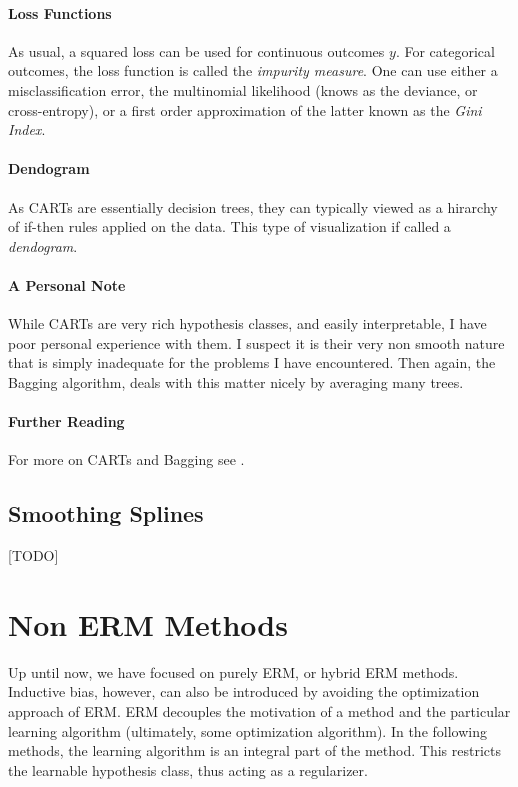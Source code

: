 \documentclass[12pt,a4paper]{article}
\theoremstyle{plain}
\theoremstyle{definition}
\begin{document}
\paragraph{Loss Functions}
As usual, a squared loss can be used for continuous outcomes $y$.
For categorical outcomes, the loss function is called the \emph{impurity measure}.
One can use either a misclassification error, the multinomial likelihood (knows as the deviance, or cross-entropy), or a first order approximation of the latter known as the \emph{Gini Index}.


\paragraph{Dendogram}
As CARTs are essentially decision trees, they can typically viewed as a hirarchy of if-then rules applied on the data.
This type of visualization if called a \emph{dendogram}.

\paragraph{A Personal Note}
While CARTs are very rich hypothesis classes, and easily interpretable, I have poor personal experience with them. 
I suspect it is their very non smooth nature that is simply inadequate for the problems I have encountered.
Then again, the Bagging algorithm, deals with this matter nicely by averaging many trees.


\paragraph{Further Reading}
For more on CARTs and Bagging see \citep[Section 9]{hastie_elements_2003}.



\subsection{Smoothing Splines}
[TODO]





\section{Non ERM Methods}
\label{sec:non_erm}
Up until now, we have focused on purely ERM, or hybrid ERM methods.
Inductive bias, however, can also be introduced by avoiding the optimization approach of ERM.
ERM decouples the motivation of a method and the particular learning algorithm (ultimately, some optimization algorithm).
In the following methods, the learning algorithm is an integral part of the method. 
This restricts the learnable hypothesis class, thus acting as a regularizer.
\end{document}
